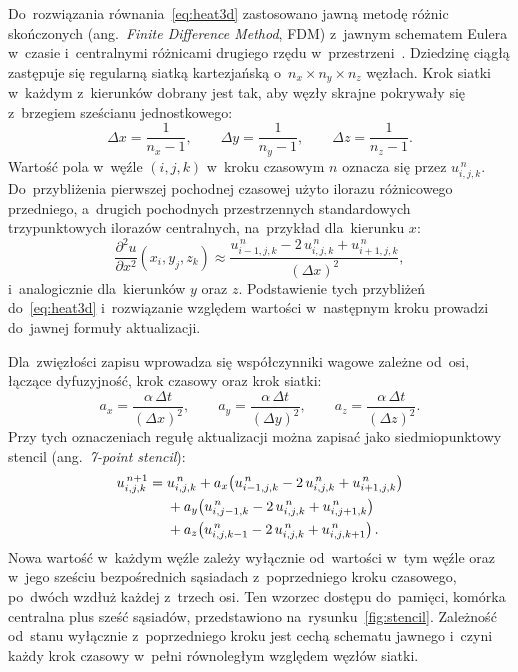 Do~rozwiązania równania~\eqref{eq:heat3d} zastosowano jawną metodę różnic
skończonych (ang.\ \emph{Finite Difference Method}, FDM) z~jawnym schematem
Eulera w~czasie i~centralnymi różnicami drugiego rzędu w~przestrzeni~\cite{leveque,strikwerda}. Dziedzinę
ciągłą zastępuje się regularną siatką kartezjańską o~\(n_x\times n_y\times n_z\)
węzłach. Krok siatki w~każdym z~kierunków dobrany jest tak, aby węzły skrajne
pokrywały się z~brzegiem sześcianu jednostkowego:
\begin{equation}
  \Delta x = \frac{1}{n_x-1}, \qquad
  \Delta y = \frac{1}{n_y-1}, \qquad
  \Delta z = \frac{1}{n_z-1}.
  \label{eq:spacing}
\end{equation}
Wartość pola w~węźle \((i,j,k)\) w~kroku czasowym \(n\) oznacza się przez
\(u_{i,j,k}^{\,n}\). Do~przybliżenia pierwszej pochodnej czasowej użyto ilorazu
różnicowego przedniego, a~drugich pochodnych przestrzennych standardowych
trzypunktowych ilorazów centralnych, na~przykład dla~kierunku
\(x\):
\begin{equation}
  \frac{\partial^2 u}{\partial x^2}(x_i,y_j,z_k)
  \approx
  \frac{u_{i-1,j,k}^{\,n} - 2\,u_{i,j,k}^{\,n} + u_{i+1,j,k}^{\,n}}{(\Delta x)^2},
  \label{eq:central}
\end{equation}
i~analogicznie dla~kierunków \(y\) oraz \(z\). Podstawienie tych przybliżeń
do~\eqref{eq:heat3d} i~rozwiązanie względem wartości w~następnym kroku prowadzi
do~jawnej formuły aktualizacji.

Dla~zwięzłości zapisu wprowadza się współczynniki wagowe zależne od~osi, łączące
dyfuzyjność, krok czasowy oraz krok siatki:
\begin{equation}
  a_x = \frac{\alpha\,\Delta t}{(\Delta x)^2}, \qquad
  a_y = \frac{\alpha\,\Delta t}{(\Delta y)^2}, \qquad
  a_z = \frac{\alpha\,\Delta t}{(\Delta z)^2}.
  \label{eq:weights}
\end{equation}
Przy tych oznaczeniach regułę aktualizacji można zapisać jako
siedmiopunktowy stencil (ang.\ \emph{7-point stencil}):
\begin{align}
  u_{i,j,k}^{\,n+1} =\; & u_{i,j,k}^{\,n}
    + a_x\!\left(u_{i-1,j,k}^{\,n} - 2\,u_{i,j,k}^{\,n} + u_{i+1,j,k}^{\,n}\right) \notag\\
    & + a_y\!\left(u_{i,j-1,k}^{\,n} - 2\,u_{i,j,k}^{\,n} + u_{i,j+1,k}^{\,n}\right) \notag\\
    & + a_z\!\left(u_{i,j,k-1}^{\,n} - 2\,u_{i,j,k}^{\,n} + u_{i,j,k+1}^{\,n}\right).
  \label{eq:update}
\end{align}
Nowa wartość w~każdym węźle zależy wyłącznie od~wartości w~tym węźle oraz
w~jego sześciu bezpośrednich sąsiadach z~poprzedniego kroku czasowego, po~dwóch
wzdłuż każdej z~trzech osi. Ten wzorzec dostępu do~pamięci, komórka centralna
plus sześć sąsiadów, przedstawiono na~rysunku~\ref{fig:stencil}. Zależność od~stanu
wyłącznie z~poprzedniego kroku jest cechą schematu jawnego i~czyni każdy krok
czasowy w~pełni równoległym względem węzłów siatki.

